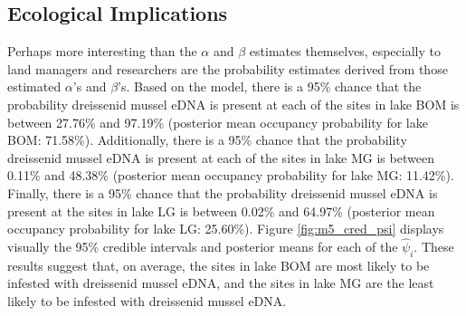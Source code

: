 \documentclass[12pt]{article}\usepackage[]{graphicx}\usepackage[]{color}
\begin{document}
\begin{table}[!h]
\caption{\label{tab:m5_alpha}
             Summary table of the $\hat \alpha$ coefficients for $logit(\hat p_{ij}) = \hat \alpha_0 +
             \hat \alpha_1water.temp_{ij}$.}
\small
{}
\end{table}

\subsection{Ecological Implications}

Perhaps more interesting than the $\alpha$ and $\beta$ estimates themselves, especially to land managers and researchers are the probability estimates derived from those estimated $\alpha$'s and $\beta$'s. Based on the model, there is a 95\% chance that the probability dreissenid mussel eDNA is present at each of the sites in lake BOM is between 27.76\% and 97.19\% (posterior mean occupancy probability for lake BOM: 71.58\%). Additionally, there is a 95\% chance that the probability dreissenid mussel eDNA is present at each of the sites in lake MG is between 0.11\% and 48.38\% (posterior mean occupancy probability for lake MG: 11.42\%). Finally, there is a 95\% chance that the probability dreissenid mussel eDNA is present at the sites in lake LG is between 0.02\% and 64.97\% (posterior mean occupancy probability for lake LG: 25.60\%). Figure \ref{fig:m5_cred_psi} displays visually the 95\% credible intervals and posterior means for each of the $\hat\psi_i$. These results suggest that, on average, the sites in lake BOM are most likely to be infested with dreissenid mussel eDNA, and the sites in lake MG are the least likely to be infested with dreissenid mussel eDNA.  
\end{document}
